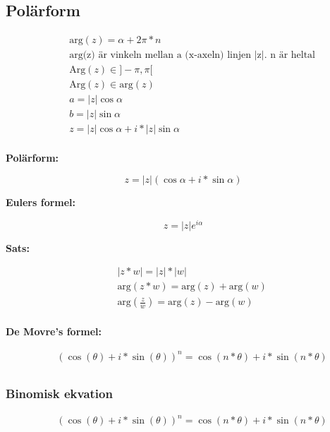 \subsection{Polärform}
\begin{align*}
  &\quad \text{arg}(z) = \alpha + 2\pi * n \\
  &\quad \text{arg(z) är vinkeln mellan a (x-axeln) linjen |z|. n är heltal}  \\
  &\quad \text{Arg}(z) \in ]-\pi, \pi[ \\
    &\quad \text{Arg}(z) \in \text{arg}(z) \\
    &\quad a = |z| \cos{\alpha} \\
    &\quad b = |z| \sin{\alpha} \\
    &\quad z = |z| \cos{\alpha} + i * |z| \sin{\alpha} \\
\end{align*}

\textbf{Polärform:}\par
\begin{equation}
  z = |z|(\cos{\alpha} + i * \sin{\alpha})
\end{equation}

\textbf{Eulers formel:}\par
\begin{equation}
  z = |z|e^{i \alpha}
\end{equation}

\textbf{Sats:}\par
\begin{align*}
  &\quad |z * w| = |z| * |w| \\
  &\quad \text{arg}(z * w) = \text{arg}(z) + \text{arg}(w) \\
  &\quad \text{arg}(\frac{z}{w}) =  \text{arg}(z) - \text{arg}(w)\\
\end{align*}

\newpage

\textbf{De Movre's formel:}\par
\begin{align*}
  &\quad (\cos{(\theta)} + i * \sin{(\theta)})^{n} = \cos{(n*\theta)} + i * \sin{(n*\theta)} \\
\end{align*}


\subsubsection{Binomisk ekvation}
\begin{align*}
  &\quad (\cos{(\theta)} + i * \sin{(\theta)})^{n} = \cos{(n*\theta)} + i * \sin{(n*\theta)} \\
\end{align*}


